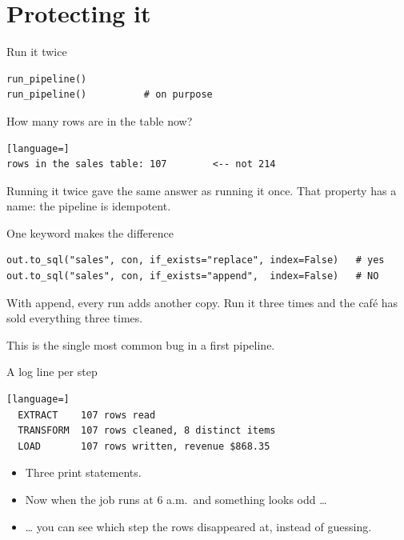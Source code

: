 \documentclass[aspectratio=169,10pt]{beamer}
\newcommand{\py}[1]{{\ttfamily\footnotesize\color{ink}#1}}
\begin{document}
\section{Protecting it}

\begin{frame}[fragile]{Run it twice}
\begin{lstlisting}
run_pipeline()
run_pipeline()          # on purpose
\end{lstlisting}

  \pause
  \begin{ask}
    \small
    How many rows are in the table now?
  \end{ask}

  \pause
\begin{lstlisting}[language=]
rows in the sales table: 107        <-- not 214
\end{lstlisting}

  \pause
  \begin{aside}
    \small
    Running it twice gave the same answer as running it once. That property has a name: the pipeline
    is \alert{idempotent}.
  \end{aside}
\end{frame}

\begin{frame}[fragile]{One keyword makes the difference}
\begin{lstlisting}
out.to_sql("sales", con, if_exists="replace", index=False)   # yes
out.to_sql("sales", con, if_exists="append",  index=False)   # NO
\end{lstlisting}

  \pause
  \begin{watch}
    \small
    With \py{append}, every run adds another copy. Run it three times and the caf\'e has sold
    everything three times.

    \medskip
    This is the \alert{single most common bug in a first pipeline}.
  \end{watch}
\end{frame}

\begin{frame}[fragile]{A log line per step}
\begin{lstlisting}[language=]
  EXTRACT    107 rows read
  TRANSFORM  107 rows cleaned, 8 distinct items
  LOAD       107 rows written, revenue $868.35
\end{lstlisting}

  \pause
  \begin{itemize}[<+->]
    \item Three \py{print} statements.
    \item Now when the job runs at 6 a.m.\ and something looks odd \ldots{}
    \item \ldots{} you can see \alert{which step} the rows disappeared at, instead of guessing.
  \end{itemize}
\end{frame}
\end{document}

